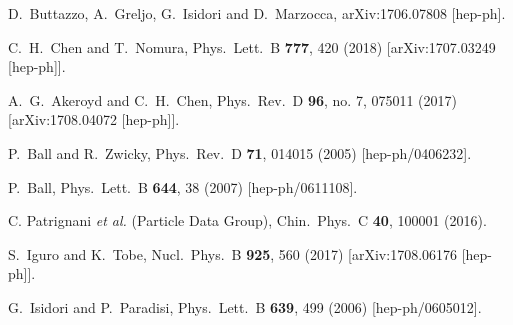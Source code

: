 \documentclass[prd,preprint,superscriptaddress,amsmath,amssymb]{revtex4}
\begin{document}
\begin{thebibliography}{100}
  
  D.~Buttazzo, A.~Greljo, G.~Isidori and D.~Marzocca,
  arXiv:1706.07808 [hep-ph].

  C.~H.~Chen and T.~Nomura,
  Phys.\ Lett.\ B {\bf 777}, 420 (2018)
  [arXiv:1707.03249 [hep-ph]].
  
  A.~G.~Akeroyd and C.~H.~Chen,
  Phys.\ Rev.\ D {\bf 96}, no. 7, 075011 (2017)
  [arXiv:1708.04072 [hep-ph]].
  
 
  
  P.~Ball and R.~Zwicky,
  Phys.\ Rev.\ D {\bf 71}, 014015 (2005)
  [hep-ph/0406232].
  
  P.~Ball,
  Phys.\ Lett.\ B {\bf 644}, 38 (2007)
  [hep-ph/0611108].
  

  
   C. Patrignani {\it et al.} (Particle Data Group), Chin.\ Phys.\ C {\bf 40}, 100001 (2016).



  
  S.~Iguro and K.~Tobe,
  Nucl.\ Phys.\ B {\bf 925}, 560 (2017)
  [arXiv:1708.06176 [hep-ph]].


  G.~Isidori and P.~Paradisi,
  Phys.\ Lett.\ B {\bf 639}, 499 (2006)
  [hep-ph/0605012].
  

\end{thebibliography}
\end{document}
